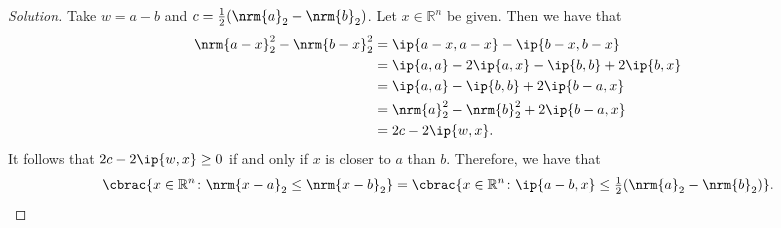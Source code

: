 \documentclass[10pt, a4paper, twoside]{amsart}
\newcommand{\R}{\ensuremath{\mathbb{R}}}
\DeclarePairedDelimiter\cbrac\{\}
\DeclarePairedDelimiter{\ip}\langle\rangle
\DeclarePairedDelimiter{\nrm}\lVert\rVert
\renewcommand{\c}{\ensuremath{\colon}}
\newenvironment{solution}
               {\let\oldqedsymbol=\qedsymbol
                \renewcommand{\qedsymbol}{$\blacktriangleleft$}
                \begin{proof}[Solution]}
               {\end{proof}
                \renewcommand{\qedsymbol}{\oldqedsymbol}}
\begin{document}
\begin{solution}
 Take $w=a-b$ and $c=\tfrac{1}{2}(\nrm{a}_2-\nrm{b}_2)$. Let $x \in \R^n$ be given.
 Then we have that 
 \begin{align*}
 \nrm{a-x}_2^2 -\nrm{b-x}_2^2 &= \ip{a-x, a-x}-\ip{b-x, b-x} \\
 &= \ip{a,a}-2\ip{a,x}-\ip{b,b} + 2\ip{b,x} \\
 &= \ip{a,a}-\ip{b,b} + 2\ip{b-a,x} \\
 &= \nrm{a}_2^2-\nrm{b}_2^2 + 2\ip{b-a,x} \\
 &= 2c - 2\ip{w,x}.
 \end{align*}
 It follows that $2c - 2\ip{w,x} \geq 0$ if and only if $x$ is closer to $a$ than $b$.
 Therefore, we have that 
 \begin{equation*}
  \cbrac{x \in \R^n \c \nrm{x-a}_2 \leq \nrm{x-b}_2}=\cbrac{x \in \R^n \c \ip{a-b,x} \leq \tfrac{1}{2}(\nrm{a}_2-\nrm{b}_2)}.
 \end{equation*}

 
\end{solution}

 
\end{document}

